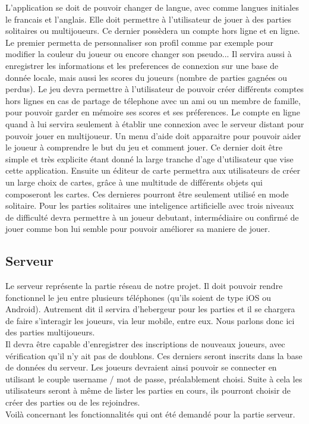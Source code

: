 	L'application se doit de pouvoir changer de langue, avec comme langues initiales le francais et l'anglais.
	Elle doit permettre à l'utilisateur de jouer à des parties solitaires ou multijoueurs. 
	Ce dernier possèdera un compte hors ligne et en ligne.		
	Le premier permetta de personnaliser son profil comme par exemple pour modifier
	la couleur du joueur ou encore changer son pseudo... Il servira aussi à enregistrer les informations
	et les preferences de connexion sur une base de donnée locale,
	mais aussi les scores du joueurs (nombre de parties gagnées ou perdus). 
	Le jeu devra permettre à l'utilisateur de pouvoir créer différents comptes hors lignes en cas de partage de télephone
	avec un ami ou un membre de famille, pour pouvoir garder en mémoire ses scores et ses préferences.		
	Le compte en ligne quand à lui servira seulement à établir une connexion avec le serveur distant pour pouvoir jouer en multijoueur.		
	Un menu d'aide doit apparaitre pour pouvoir aider le joueur à comprendre le but du jeu et comment jouer. 
	Ce dernier doit être simple et très explicite étant donné la large tranche d'age d'utilisateur que vise cette application.		
	Ensuite un éditeur de carte permettra aux utilisateurs de créer un large choix de cartes, 
	grâce à une multitude de différents objets qui composeront les cartes. Ces dernieres pourront être seulement utilisé en mode solitaire.
	Pour les parties solitaires une inteligence artificielle avec trois niveaux de difficulté 
	devra permettre à un joueur debutant, intermédiaire ou confirmé de jouer comme bon lui semble pour pouvoir améliorer sa maniere de jouer.
	
\subsection{Serveur}
	
	Le serveur représente la partie réseau de notre projet. Il doit pouvoir
	rendre fonctionnel le jeu entre plusieurs téléphones (qu'ils soient de type
	iOS ou Android). Autrement dit il servira d'hebergeur pour les parties et
	il se chargera de faire s'interagir les joueurs, via leur mobile, entre eux.
	Nous parlons donc ici des parties multijoueurs.\\ 
	Il devra être capable d'enregistrer des inscriptions de nouveaux joueurs, avec
	vérification qu'il n'y ait pas de doublons. Ces derniers seront inscrits dans 
	la base de données du serveur. Les joueurs devraient ainsi
	pouvoir se connecter en utilisant le couple username / mot de passe,
	préalablement choisi. Suite à cela les utilisateurs seront à même de lister
	les parties en cours, ils pourront choisir de créer des parties ou de les rejoindres.\\
	Voilà concernant les fonctionnalités qui ont été demandé pour la partie
	serveur.